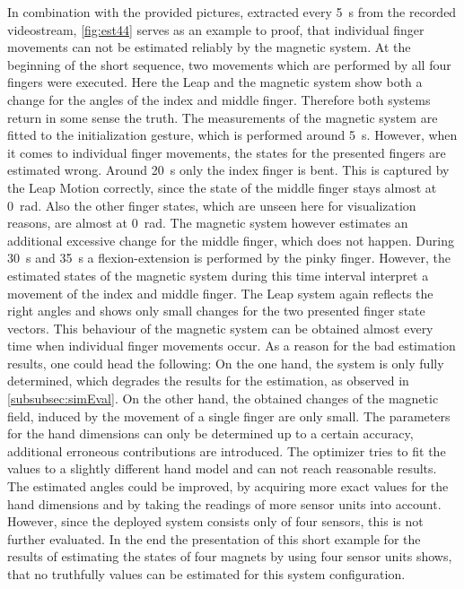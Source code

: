 In combination with the provided pictures, extracted every \SI{5}{\second} from the recorded videostream, \ref{fig:est44} serves as an example to proof, that individual finger movements can not be estimated reliably by the magnetic system. At the beginning of the short sequence, two movements which are performed by all four fingers were executed. Here the Leap and the magnetic system show both a change for the angles of the index and middle finger. Therefore both systems return in some sense the truth. The measurements of the magnetic system are fitted to the initialization gesture, which is performed around \SI{5}{\second}. However, when it comes to individual finger movements, the states for the presented fingers are estimated wrong. Around \SI{20}{\second} only the index finger is bent. This is captured by the Leap Motion correctly, since the state of the middle finger stays almost at \SI{0}{\radian}. Also the other finger states, which are unseen here for visualization reasons, are almost at \SI{0}{\radian}. The magnetic system however estimates an additional excessive change for the middle finger, which does not happen. During \SI{30}{\second} and \SI{35}{\second} a flexion-extension is performed by the pinky finger. However, the estimated states of the magnetic system during this time interval interpret a movement of the index and middle finger. The Leap system again reflects the right angles and shows only small changes for the two presented finger state vectors. This behaviour of the magnetic system can be obtained almost every time when individual finger movements occur. As a reason for the bad estimation results, one could head the following: On the one hand, the system is only fully determined, which degrades the results for the estimation, as observed in \ref{subsubsec:simEval}. On the other hand, the obtained changes of the magnetic field, induced by the movement of a single finger are only small. The parameters for the hand dimensions can only be determined up to a certain accuracy, additional erroneous contributions are introduced. The optimizer tries to fit the values to a slightly different hand model and can not reach reasonable results. The estimated angles could be improved, by acquiring more exact values for the hand dimensions and by taking the readings of more sensor units into account. However, since the deployed system consists only of four sensors, this is not further evaluated. In the end the presentation of this short example for the results of estimating the states of four magnets by using four sensor units shows, that no truthfully values can be estimated for this system configuration.
\FloatBarrier

